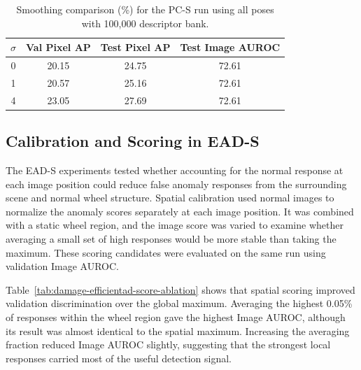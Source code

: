 \begin{table}[ht!]
    \centering
    \begin{tabular}{@{}c c c c@{}}
        \toprule
        \textbf{\(\sigma\)} & \textbf{Val Pixel AP} & \textbf{Test Pixel AP} & \textbf{Test Image AUROC} \\
        \midrule
        \midrule
        0                   & 20.15                 & 24.75                  & 72.61                     \\
        1                   & 20.57                 & 25.16                  & 72.61                     \\
        4                   & 23.05                 & 27.69                  & 72.61                     \\
        \bottomrule
    \end{tabular}
    \vspace{5mm}
    \caption{Smoothing comparison (\%) for the PC-S run using all poses with 100,000 descriptor bank.}
    \label{tab:damage-patchcore-smoothing-ablation}
\end{table}

\subsection{Calibration and Scoring in EAD-S}
\label{sec:damage-efficientad-ablation}

The EAD-S experiments tested whether accounting for the normal response at each image position could reduce false anomaly responses from the surrounding scene and normal wheel structure. Spatial calibration used normal images to normalize the anomaly scores separately at each image position. It was combined with a static wheel region, and the image score was varied to examine whether averaging a small set of high responses would be more stable than taking the maximum. These scoring candidates were evaluated on the same run using validation Image AUROC.

Table~\ref{tab:damage-efficientad-score-ablation} shows that spatial scoring improved validation discrimination over the global maximum. Averaging the highest 0.05\% of responses within the wheel region gave the highest Image AUROC, although its result was almost identical to the spatial maximum. Increasing the averaging fraction reduced Image AUROC slightly, suggesting that the strongest local responses carried most of the useful detection signal.


